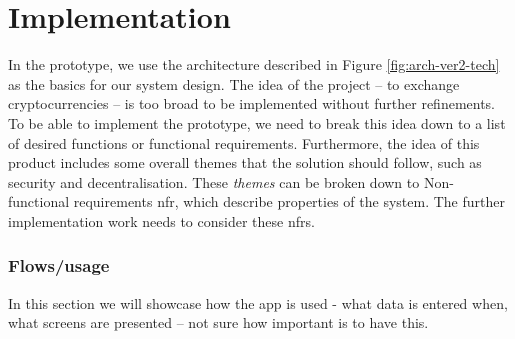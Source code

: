 \section{Implementation}
% 
In the prototype, we use the architecture described in Figure \ref{fig:arch-ver2-tech} as the basics for our system design. The idea of the project -- to exchange cryptocurrencies -- is too broad to be implemented without further refinements. To be able to implement the prototype, we need to break this idea down to a list of desired functions or functional requirements. Furthermore, the idea of this product includes some overall themes that the solution should follow, such as security and decentralisation. These \textit{themes} can be broken down to Non-functional requirements \acrshort{nfr}, which describe properties of the system. The further implementation work needs to consider these \acrshort{nfr}s.














\subsubsection{Flows/usage}
% 
In this section we will showcase how the app is used - what data is entered when, what screens are presented -- not sure how important is to have this.


